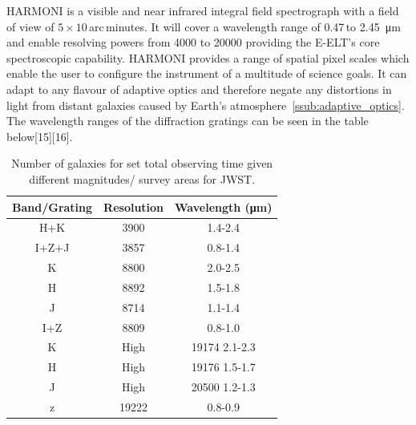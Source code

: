			HARMONI is a visible and near infrared integral field spectrograph with a field of view of $5 \times 10$\,arc\,minutes. It will cover a wavelength range of 0.47\,to \SI{2.45}{\micro\metre} and enable resolving powers from \num{4000} to \num{20000} providing the E-ELT's core spectroscopic capability. HARMONI provides a range of spatial pixel scales which enable the user to configure the instrument of a multitude of science goals. It can adapt to any flavour of adaptive optics and therefore negate any distortions in light from distant galaxies caused by Earth’s atmosphere~\ref{ssub:adaptive_optics}. The wavelength ranges of the diffraction gratings can be seen in the table below\cite{}[15]\cite{}[16].
			\begin{table}[!htbp]
				\begin{center}
					\begin{tabular}{c|c|c}
						Band/Grating & Resolution & Wavelength (\si{\micro\metre}) \\
						\hline \hline
						H+K 	& 3900 	& 1.4-2.4 \\
						I+Z+J 	& 3857 	& 0.8-1.4 \\
						K 		& 8800 	& 2.0-2.5 \\
						H 		& 8892 	& 1.5-1.8 \\
						J 		& 8714 	& 1.1-1.4 \\
						I+Z 	& 8809 	& 0.8-1.0 \\
						K 		& High 	& 19174 2.1-2.3 \\
						H 		& High 	& 19176 1.5-1.7 \\
						J 		& High 	& 20500 1.2-1.3 \\
						z 		& 19222 & 0.8-0.9
					\end{tabular}
				\end{center}
				\caption{Number of galaxies for set total observing time given different magnitudes/ survey areas for JWST.\label{tab:galaxies_for_set_total_observing_time_JWST}}
			\end{table}
